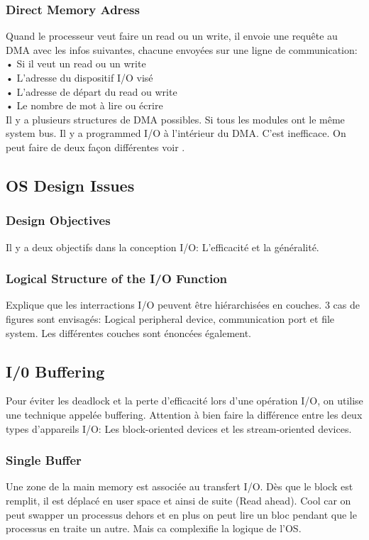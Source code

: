 \subsubsection{Direct Memory Adress}
Quand le processeur veut faire un read ou un write, il envoie une requête au DMA avec les infos suivantes, chacune envoyées sur une ligne de communication: \\
• Si il veut un read ou un write \\
• L'adresse du dispositif I/O visé \\
• L'adresse de départ du read ou write \\
• Le nombre de mot à lire ou écrire \\
Il y a plusieurs structures de DMA possibles. Si tous les modules ont le même system bus. Il y a programmed I/O à l'intérieur du DMA. C'est inefficace. On peut faire de deux façon différentes voir \cite[p.~500]{stallings}.

\subsection{OS Design Issues}

\subsubsection{Design Objectives}
Il y a deux objectifs dans la conception I/O: L'efficacité et la généralité.

\subsubsection{Logical Structure of the I/O Function}
Explique que les interractions I/O peuvent être hiérarchisées en couches.
3 cas de figures sont envisagés: Logical peripheral device, communication port et file system.
Les différentes couches sont énoncées également.

\subsection{I/0 Buffering}
Pour éviter les deadlock et la perte d'efficacité lors d'une opération I/O, on utilise une technique appelée buffering.
Attention à bien faire la différence entre les deux types d'appareils I/O: Les block-oriented devices et les stream-oriented devices.

\subsubsection{Single Buffer}
Une zone de la main memory est associée au transfert I/O.
Dès que le block est remplit, il est déplacé en user space et ainsi de suite (Read ahead).
Cool car on peut swapper un processus dehors et en plus on peut lire un bloc pendant que le processus en traite un autre.
Mais ca complexifie la logique de l'OS.


